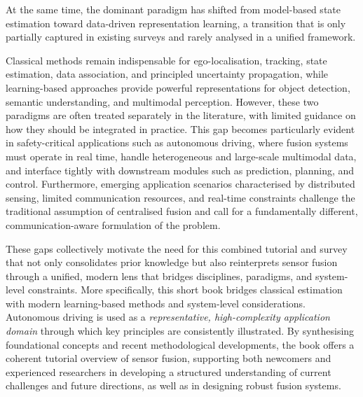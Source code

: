 \documentclass[11pt,oneside,openany]{book}
\begin{document}
At the same time, the dominant paradigm has shifted from model-based state estimation toward data-driven representation learning, a transition that is only partially captured in existing surveys and rarely analysed in a unified framework.

%
Classical methods remain indispensable for ego-localisation, tracking, state estimation, data association, and principled uncertainty propagation, while learning-based approaches provide powerful representations for object detection, semantic understanding, and multimodal perception. However, these two paradigms are often treated separately in the literature, with limited guidance on how they should be integrated in practice. This gap becomes particularly evident in safety-critical applications such as autonomous driving, where fusion systems must operate in real time, handle heterogeneous and large-scale multimodal data, and interface tightly with downstream modules such as prediction, planning, and control.
%
Furthermore, emerging application scenarios characterised by distributed sensing, limited communication resources, and real-time constraints challenge the traditional assumption of centralised fusion and call for a fundamentally different, communication-aware formulation of the problem.



These gaps collectively motivate the need for this combined tutorial and survey that not only consolidates prior knowledge but also reinterprets sensor fusion through a unified, modern lens that bridges disciplines, paradigms, and system-level constraints. More specifically, this short book bridges classical estimation with modern learning-based methods and system-level considerations. Autonomous driving is used as a \emph{representative, high-complexity application domain} through which key principles are consistently illustrated. By synthesising foundational concepts and recent methodological developments, the book offers a coherent tutorial overview of sensor fusion, supporting both newcomers and experienced researchers in developing a structured understanding of current challenges and future directions, as well as in designing robust fusion systems.
\end{document}
